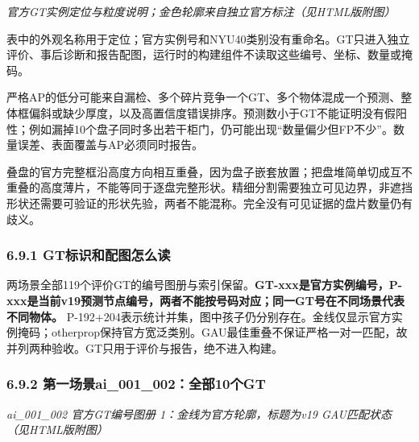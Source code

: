 \documentclass[UTF8,fontset=fandol]{ctexart}
\begin{document}
\textit{官方GT实例定位与粒度说明；金色轮廓来自独立官方标注（见HTML版附图）}



表中的外观名称用于定位；官方实例号和NYU40类别没有重命名。GT只进入独立评价、事后诊断和报告配图，运行时的构建组件不读取这些编号、坐标、数量或掩码。



严格AP的低分可能来自漏检、多个碎片竞争一个GT、多个物体混成一个预测、整体框偏斜或缺少厚度，以及高置信度错误排序。预测数小于GT不能证明没有假阳性；例如漏掉10个盘子同时多出若干柜门，仍可能出现“数量偏少但FP不少”。数量误差、表面覆盖与AP必须同时报告。



叠盘的官方完整框沿高度方向相互重叠，因为盘子嵌套放置；把盘堆简单切成互不重叠的高度薄片，不能等同于逐盘完整形状。精细分割需要独立可见边界，非遮挡形状还需要可验证的形状先验，两者不能混称。完全没有可见证据的盘片数量仍有歧义。



\subsubsection*{6.9.1 GT标识和配图怎么读}

两场景全部119个评价GT的编号图册与索引保留。\textbf{GT-xxx是官方实例编号，P-xxx是当前v19预测节点编号，两者不能按号码对应；同一GT号在不同场景代表不同物体。} P-192+204表示统计并集，图中孩子仍分别存在。金线仅显示官方实例掩码；otherprop保持官方宽泛类别。GAU最佳重叠不保证严格一对一匹配，故并列两种验收。GT只用于评价与报告，绝不进入构建。



\subsubsection*{6.9.2 第一场景ai\_001\_002：全部10个GT}

\textit{ai\_001\_002 官方GT编号图册 1：金线为官方轮廓，标题为v19 GAU匹配状态（见HTML版附图）}
\end{document}
